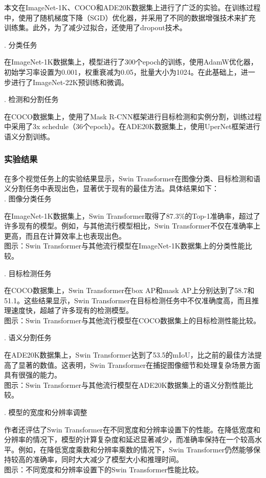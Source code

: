 \documentclass{article}
\begin{document}
本文在ImageNet-1K、COCO和ADE20K数据集上进行了广泛的实验。在训练过程中，使用了随机梯度下降（SGD）优化器，并采用了不同的数据增强技术来扩充训练集。此外，为了减少过拟合，还使用了dropout技术。

. 分类任务

在ImageNet-1K数据集上，模型进行了300个epoch的训练，使用AdamW优化器，初始学习率设置为0.001，权重衰减为0.05，批量大小为1024。在此基础上，进一步进行了ImageNet-22K预训练和微调。

. 检测和分割任务

在COCO数据集上，使用了Mask R-CNN框架进行目标检测和实例分割，训练过程中采用了3x schedule（36个epoch）。在ADE20K数据集上，使用UperNet框架进行语义分割训练。

\subsubsection{实验结果}
在多个视觉任务上的实验结果显示，Swin Transformer在图像分类、目标检测和语义分割任务中表现出色，显著优于现有的最佳方法。具体结果如下：\\
. 图像分类任务

在ImageNet-1K数据集上，Swin Transformer取得了87.3\%的Top-1准确率，超过了许多现有的模型。例如，与其他流行模型相比，Swin Transformer不仅在准确率上更高，而且在计算效率上也表现出色。\\
图示：Swin Transformer与其他流行模型在ImageNet-1K数据集上的分类性能比较。  

. 目标检测任务

在COCO数据集上，Swin Transformer在box AP和mask AP上分别达到了58.7和51.1。这些结果显示，Swin Transformer在目标检测任务中不仅准确度高，而且推理速度快，超越了许多现有的检测模型。\\
图示：Swin Transformer与其他流行模型在COCO数据集上的目标检测性能比较。

. 语义分割任务

在ADE20K数据集上，Swin Transformer达到了53.5的mIoU，比之前的最佳方法提高了显著的数值。这表明，Swin Transformer在捕捉图像细节和处理复杂场景方面具有很强的能力。\\
图示：Swin Transformer与其他流行模型在ADE20K数据集上的语义分割性能比较。

. 模型的宽度和分辨率调整

作者还评估了Swin Transformer在不同宽度和分辨率设置下的性能。在降低宽度和分辨率的情况下，模型的计算复杂度和延迟显著减少，而准确率保持在一个较高水平。例如，在降低宽度乘数和分辨率乘数的情况下，Swin Transformer仍然能够保持较高的准确率，同时大大减少了模型大小和推理时间。\\
图示：不同宽度和分辨率设置下的Swin Transformer性能比较。
\end{document}
